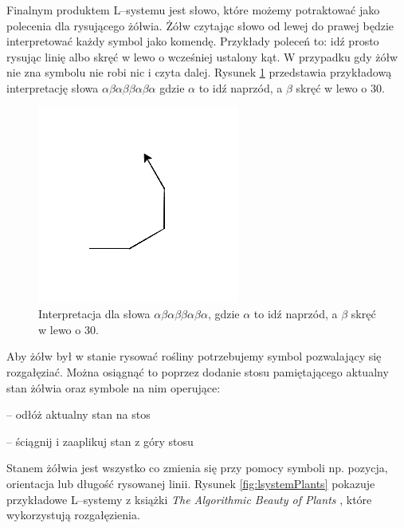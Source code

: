 \documentclass[inz,shortabstract]{iithesis}
\begin{document}
        Finalnym produktem L--systemu jest słowo, które możemy potraktować jako polecenia dla rysującego żółwia. Żółw czytając słowo od lewej do prawej będzie interpretować każdy symbol jako komendę. Przykłady poleceń to: idź prosto rysując linię albo skręć w lewo o wcześniej ustalony kąt. W przypadku gdy żółw nie zna symbolu nie robi nic i czyta dalej. Rysunek \ref{fig:turtleExample} przedstawia przykładową interpretację słowa $\alpha\beta\alpha\beta\beta\alpha\beta\alpha$ gdzie $\alpha$ to idź naprzód, a $\beta$ skręć w lewo o 30\degree.
        \begin{figure}[h]
            \centering
            \includegraphics[width=0.4\linewidth]{turtleExample.png}
            \caption{Interpretacja dla słowa $\alpha\beta\alpha\beta\beta\alpha\beta\alpha$, gdzie $\alpha$ to idź naprzód, a $\beta$ skręć w lewo o 30\degree.}
            \label{fig:turtleExample}
        \end{figure}
        
        Aby żółw był w stanie rysować rośliny potrzebujemy symbol pozwalający się rozgałęziać. Można osiągnąć to poprzez dodanie stosu pamiętającego aktualny stan żółwia oraz symbole na nim operujące:
        \begin{description}[itemsep=2pt, parsep=2pt, topsep=2pt, partopsep=2pt]
            \item[{[}] -- odłóż aktualny stan na stos
            \item[{]}] -- ściągnij i zaaplikuj stan z góry stosu 
        \end{description}
        Stanem żółwia jest wszystko co zmienia się przy pomocy symboli np. pozycja, orientacja lub długość rysowanej linii. Rysunek \ref{fig:lsystemPlants} pokazuje przykładowe L--systemy z książki \textit{The Algorithmic Beauty of Plants}  \cite{plants}, które wykorzystują rozgałęzienia. 
        
\end{document}
